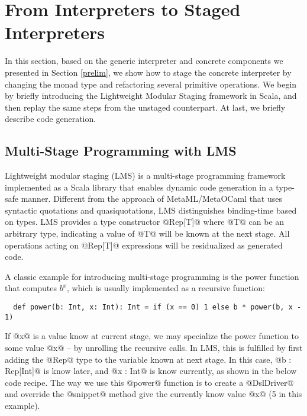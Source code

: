 \section{From Interpreters to Staged Interpreters} \label{stagedinterp}

In this section, based on the generic interpreter and concrete components we
presented in Section \ref{prelim}, we show how to stage the concrete interpreter
by changing the monad type and refactoring several primitive operations. We
begin by briefly introducing the Lightweight Modular Staging framework in Scala,
and then replay the same steps from the unstaged counterpart. At last, we briefly
describe code generation.

\subsection{Multi-Stage Programming with LMS}

Lightweight modular staging (LMS) \cite{DBLP:conf/gpce/RompfO10} is a
multi-stage programming framework implemented as a Scala library that enables
dynamic code generation in a type-safe manner. Different from the approach of
MetaML/MetaOCaml \cite{DBLP:conf/flops/Kiselyov14, DBLP:conf/gpce/CalcagnoTHL03} that
uses syntactic quotations and quasiquotations, LMS distinguishes binding-time
based on types. LMS provides a type constructor @Rep[T]@ where @T@ can be
an arbitrary type, indicating a value of @T@ will be known at the next stage.
All operations acting on @Rep[T]@ expressions will be residualized as generated
code.

A classic example for introducing multi-stage programming is the power function
that computes $b^x$, which is usually implemented as a recursive function:

\begin{lstlisting}
  def power(b: Int, x: Int): Int = if (x == 0) 1 else b * power(b, x - 1)
\end{lstlisting}

If @x@ is a value know at current stage, we may specialize the power function to
some value @x@ -- by unrolling the recursive calls. In LMS, this is fulfilled by
first adding the @Rep@ type to the variable known at next stage. In this case,
@b : Rep[Int]@ is know later, and @x : Int@ is know currently, as shown in the
below code recipe.
The way we use this @power@ function is to create a @DslDriver@ and override the
@snippet@ method give the currently know value @x@ (5 in this example).

